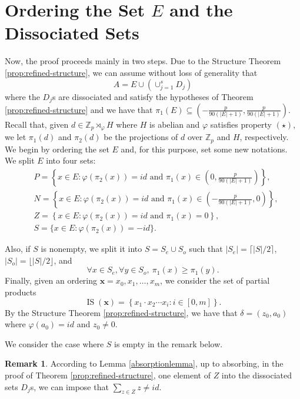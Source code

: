 \documentclass[11pt]{amsart}
\theoremstyle{definition}
\newtheorem{remark}[theorem]{Remark}
\newcommand{\bx}{\mathbf{x}}
\DeclareMathOperator{\IS}{IS}
\begin{document}
\section{\texorpdfstring{Ordering the Set $E$ and the Dissociated Sets}{Ordering the Set E and the Dissociated Sets}}\label{sec:PN}
Now, the proof proceeds mainly in two steps. Due to the Structure Theorem \ref{prop:refined-structure}, we can assume without loss of generality that $$A = E \cup(\cup_{j=1}^{s} D_j)$$
where the $D_j$s are dissociated and satisfy the hypotheses of Theorem \ref{prop:refined-structure} and we have that $\pi_1(E)\subseteq \left(-\frac{p}{90(|E|+1)},\frac{p}{90(|E|+1)}\right)$. Recall that, given $d\in \mathbb{Z}_{p} \rtimes_{\varphi} H$ where $H$ is abelian and $\varphi$ satisfies property $(\star)$, we let $\pi_1(d)$ and $\pi_2(d)$ be the projections of $d$ over $\mathbb{Z}_p$ and $H$, respectively. We begin by ordering the set $E$ and, for this purpose, set some new notations. We split $E$ into four sets:
\begin{align}
\nonumber
&P=\left\{x\in E: \varphi(\pi_2(x))= id \mbox{ and } \pi_1(x)\in \left(0,\frac{p}{90(|E|+1)}\right)\right\}, \\
\label{def: splitSets}
&N=\left\{x\in E: \varphi(\pi_2(x))=id \mbox{ and } \pi_1(x)\in \left(-\frac{p}{90(|E|+1)},0\right)\right\}, \\
\nonumber
&Z=\left\{x \in E: \varphi(\pi_2(x)) = id \mbox{ and } \pi_1(x) = 0 \right\}, \\
\nonumber
&S=\{x\in E: \varphi(\pi_2(x))=-id\}.
\end{align}

Also, if $S$ is nonempty, we split it into $S=S_e\cup S_o$ such that $|S_e|=\lceil |S|/2\rceil$,  $|S_o|=\lfloor |S|/2\rfloor$, and 
\begin{equation}\label{eq: ordering}
\forall x\in S_e, \forall y\in S_o,\ \pi_1(x)\geq\pi_1(y).
\end{equation}
Finally, given an ordering $\bx=x_0,x_1,\dots,x_m$, we consider the set of partial products
$$\IS(\bx)=\left\{x_1 \cdot x_2 \cdots x_i: i\in [0,m]\right\}.$$
By the Structure Theorem \ref{prop:refined-structure}, we have that $\delta = (z_0, a_0)$ where $\varphi(a_0) = id$ and $z_0 \neq 0$.

We consider the case where $S$ is empty in the remark below.

\begin{remark}\label{rem: structureDirect}
According to Lemma \ref{absorptionlemma}, up to absorbing, in the proof of Theorem \ref{prop:refined-structure}, one element of $Z$ into the dissociated sets $D_j$s, we can impose that $\sum_{z \in Z} z \neq id$.
\end{remark}
\end{document}
